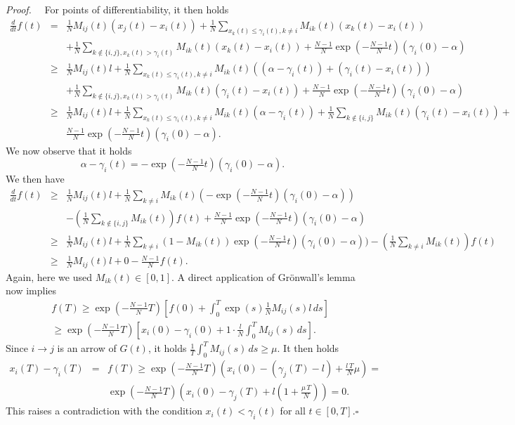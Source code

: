 \documentclass[10pt,a4paper]{amsart}
\newenvironment{proof}{{\it Proof.}~~}{\hfill$\square$}
\begin{document}
\begin{proof}
 For points of differentiability, it then holds
\begin{eqnarray}
\frac{d}{dt} f(t)&=&\frac1N M_{ij}(t)(x_j(t)-x_i(t))+\frac1N \sum_{x_k(t) \leq \gamma_i(t),k\neq i} M_{ik}(t)(x_k(t)-x_i(t))\nonumber \\
& &+\frac1N \sum_{k\not\in\{ i,j\}, x_k(t)> \gamma_i(t)} M_{ik}(t)(x_k(t)-x_i(t))+\tfrac{N-1}{N}\exp(-\tfrac{N-1}{N}t)(\gamma_i(0)-\alpha)\nonumber \\
&\geq& \frac1N M_{ij}(t)l +\frac1N \sum_{x_k(t) \leq \gamma_i(t),k\neq i} M_{ik}(t)((\alpha-\gamma_i(t))+(\gamma_i(t)-x_i(t)))\nonumber \\
& &+\frac1N \sum_{k\not\in\{i, j\}, x_k(t)> \gamma_i(t)} M_{ik}(t)(\gamma_i(t)-x_i(t))+\tfrac{N-1}{N}\exp(-\tfrac{N-1}{N}t)(\gamma_i(0)-\alpha)\nonumber \\
&\geq& \frac1N M_{ij}(t)l +\frac1N \sum_{x_k(t) \leq \gamma_i(t),k\neq i} M_{ik}(t)(\alpha-\gamma_i(t))+\frac1N \sum_{k\not\in\{i, j\}} M_{ik}(t)(\gamma_i(t)-x_i(t))+\nonumber\\
&&\tfrac{N-1}{N}\exp(-\tfrac{N-1}{N}t)(\gamma_i(0)-\alpha).\nonumber 
\end{eqnarray}
We now observe that it holds $$\alpha-\gamma_i(t)= -\exp(-\tfrac{N-1}{N}t)(\gamma_i(0)-\alpha).$$ We then have 
\begin{eqnarray}
\frac{d}{dt} f(t)&\geq& \frac1N M_{ij}(t)l +\frac1N \sum_{k\neq i} M_{ik}(t)(-\exp(-\tfrac{N-1}{N}t)(\gamma_i(0)-\alpha)) \nonumber\\
&&-\left(\frac1N \sum_{k\not\in\{i, j\}} M_{ik}(t)\right) f(t) +\tfrac{N-1}{N}\exp(-\tfrac{N-1}{N}t)(\gamma_i(0)-\alpha)\nonumber\\
&\geq&\frac1N M_{ij}(t)l + \frac1N \sum_{k\neq i} (1-M_{ik}(t))\exp(-\tfrac{N-1}{N}t)(\gamma_i(0)-\alpha)) -\left(\frac1N \sum_{k\neq i} M_{ik}(t)\right) f(t)\nonumber\\
&\geq& \frac1N M_{ij}(t)l +0- \frac{N-1}N f(t).
\label{e-stimaf2}
\end{eqnarray}
Again, here we used $M_{ik}(t)\in [0,1]$. A direct application of  Gr\"onwall's lemma now implies 
\begin{eqnarray*}
&&f(T)\geq \exp(-\tfrac{N-1}{N}T)\left[ f(0)+\int_0^T\exp(s)\frac1N M_{ij}(s) l\,ds\right]\\
&&\geq \exp(-\tfrac{N-1}{N}T) \left[x_i(0)-\gamma_i(0)+1\cdot \frac l N  \int_0^T
M_{ij}(s)\,ds\right].
\end{eqnarray*}
Since $i\to j$ is an arrow of $G(t)$, it holds $\frac1T \int_{0}^T M_{ij}(s)\,ds\geq \mu$. It then holds
\begin{eqnarray*}
x_i(T)-\gamma_i(T)&=&f(T)\geq \exp(-\tfrac{N-1}{N}T) \left(x_i(0)-\left(\gamma_j(T)-l\right)+ \frac{l\, T}N \mu\right)=\\
&&\exp(-\tfrac{N-1}{N}T) \left(x_i(0)-\gamma_j(T)+l\left(1+\frac{\mu\, T}N\right)\right)=0.
\end{eqnarray*}
This raises a contradiction with the condition $x_i(t)< \gamma_i(t)$ for all $t\in[0,T]$.\end{proof}
\end{document}
